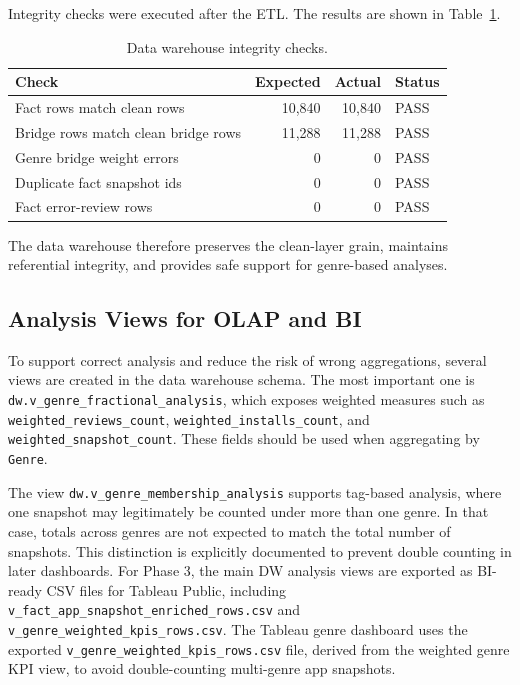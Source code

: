 \documentclass[11pt,a4paper]{article}
\begin{document}
Integrity checks were executed after the ETL. The results are shown in Table~\ref{tab:dw_integrity_checks}.

\begin{table}[H]
\centering
\caption{Data warehouse integrity checks.}
\label{tab:dw_integrity_checks}
\begin{tabular}{@{}lrrl@{}}
\toprule
\textbf{Check} & \textbf{Expected} & \textbf{Actual} & \textbf{Status} \\
\midrule
Fact rows match clean rows & 10,840 & 10,840 & PASS \\
Bridge rows match clean bridge rows & 11,288 & 11,288 & PASS \\
Genre bridge weight errors & 0 & 0 & PASS \\
Duplicate fact snapshot ids & 0 & 0 & PASS \\
Fact error-review rows & 0 & 0 & PASS \\
\bottomrule
\end{tabular}
\end{table}

The data warehouse therefore preserves the clean-layer grain, maintains referential integrity, and provides safe support for genre-based analyses.

\subsection{Analysis Views for OLAP and BI}
To support correct analysis and reduce the risk of wrong aggregations, several views are created in the data warehouse schema. The most important one is \texttt{dw.v\_genre\_fractional\_analysis}, which exposes weighted measures such as \texttt{weighted\_reviews\_count}, \texttt{weighted\_installs\_count}, and \texttt{weighted\_snapshot\_count}. These fields should be used when aggregating by \texttt{Genre}.

The view \texttt{dw.v\_genre\_membership\_analysis} supports tag-based analysis, where one snapshot may legitimately be counted under more than one genre. In that case, totals across genres are not expected to match the total number of snapshots. This distinction is explicitly documented to prevent double counting in later dashboards. For Phase 3, the main DW analysis views are exported as BI-ready CSV files for Tableau Public, including \texttt{v\_fact\_app\_snapshot\_enriched\_rows.csv} and \texttt{v\_genre\_weighted\_kpis\_rows.csv}. The Tableau genre dashboard uses the exported \texttt{v\_genre\_weighted\_kpis\_rows.csv} file, derived from the weighted genre KPI view, to avoid double-counting multi-genre app snapshots.
\end{document}
